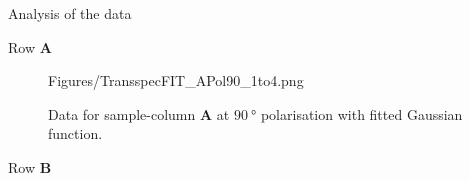 \documentclass[pdftex, a4paper,11pt, twoside, UKenglish]{report}
\begin{document}
\begin{chapter}{Analysis of the data}
\begin{section}{Row \textbf{A}}
\begin{figure}[ht!]
\begin{minipage}{.95\textwidth}
              {Figures/TransspecFIT_APol90_1to4.png}
          \caption{Data for sample-column \textbf{A} at $\SI{90}{\degree}$
              polarisation with fitted Gaussian function.}
          \label{fig:TransspecFIT_APol90_1t04}
        \end{minipage}
      \end{figure}
      
    \end{section}
    
    
    
    \newpage
    \begin{section}{Row \textbf{B}}
      \label{chp::DataB}
      
      

\end{section}
\end{chapter}
\end{document}
